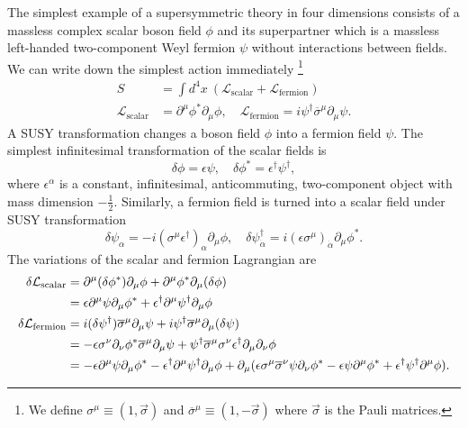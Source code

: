 \documentclass[12pt]{report}
\begin{document}
The simplest example of a supersymmetric theory in four dimensions consists of a massless complex scalar boson field $\phi$ and its superpartner which is a massless left-handed two-component Weyl fermion $\psi$ without interactions between fields.
We can write down the simplest action immediately \footnote{We define $\sigma^{\mu} \equiv (1, \vec{\sigma})$ and $\overline{\sigma}^{\mu} \equiv (1, -\vec{\sigma})$ where $\vec{\sigma}$ is the Pauli matrices.}
\begin{align}
S &= \int d^{4} x \ (\mathcal{L}_{\mathrm{scalar}} + \mathcal{L}_{\mathrm{fermion}})\\
\mathcal{L}_{\mathrm{scalar}} &= \partial^{\mu} \phi^{*} \partial_{\mu} \phi, \quad \mathcal{L}_{\mathrm{fermion}} = i \psi^{\dag} \overline{\sigma}^{\mu} \partial_{\mu} \psi .
\end{align}
A SUSY transformation changes a boson field $\phi$ into a fermion field $\psi$.
The simplest infinitesimal transformation of the scalar fields is
\begin{equation} \label{eq: susy transformation for boson fields}
\delta \phi  = \epsilon \psi, \quad \delta \phi^{*} = \epsilon^{\dag} \psi^{\dag} ,
\end{equation}
where $\epsilon^{\alpha}$ is a constant, infinitesimal, anticommuting, two-component object with mass dimension $-\frac{1}{2}$.
Similarly, a fermion field is turned into a scalar field under SUSY transformation
\begin{equation} \label{eq: susy transformation for fermion fields}
\delta \psi_{\alpha} = -i (\sigma^{\mu} \epsilon^{\dag})_{\alpha} \partial_{\mu} \phi, \quad \delta \psi^{\dag}_{\dot{\alpha}} = i (\epsilon \sigma^{\mu})_{\dot{\alpha}} \partial_{\mu} \phi^{*} .
\end{equation}
The variations of the scalar and fermion Lagrangian are
\begin{align}
\delta \mathcal{L}_{\mathrm{scalar}} &= \partial^{\mu} (\delta \phi^{*}) \partial_{\mu} \phi + \partial^{\mu} \phi^{*} \partial_{\mu} (\delta \phi) \notag \\
&= \epsilon \partial^{\mu} \psi \partial_{\mu} \phi^{*} + \epsilon^{\dag} \partial^{\mu} \psi^{\dag} \partial_{\mu} \phi\\
%
\delta \mathcal{L}_{\mathrm{fermion}} &= i (\delta \psi^{\dag}) \overline{\sigma}^{\mu} \partial_{\mu} \psi + i \psi^{\dag} \overline{\sigma}^{\mu} \partial_{\mu} (\delta \psi) \notag \\
&= -\epsilon \sigma^{\nu} \partial_{\nu} \phi^{*} \overline{\sigma}^{\mu} \partial_{\mu} \psi + \psi^{\dag} \overline{\sigma}^{\mu} \sigma^{\nu} \epsilon^{\dag} \partial_{\mu} \partial_{\nu} \phi \notag \\
&= -\epsilon \partial^{\mu} \psi \partial_{\mu} \phi^{*} - \epsilon^{\dag} \partial^{\mu} \psi^{\dag} \partial_{\mu} \phi
+\partial_{\mu} (\epsilon \sigma^{\mu} \overline{\sigma}^{\nu} \psi \partial_{\nu} \phi^{*} - \epsilon \psi \partial^{\mu} \phi^{*} + \epsilon^{\dag} \psi^{\dag} \partial^{\mu}\phi) .
\end{align}
\end{document}
